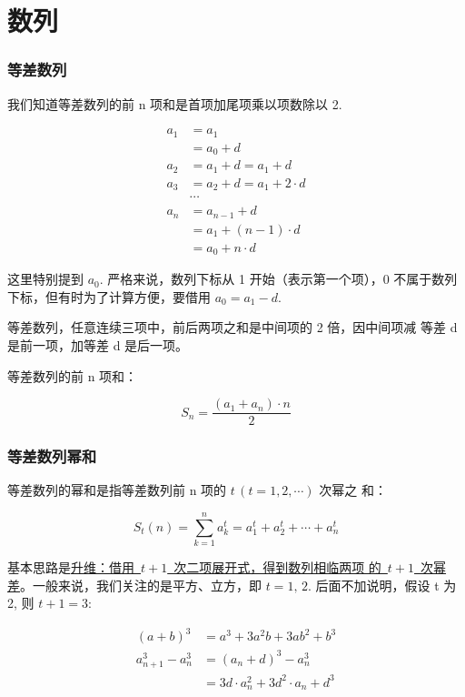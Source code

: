 \part{数列}

\section{等差数列}

我们知道等差数列的前 n 项和是首项加尾项乘以项数除以 2.

\[
  \begin{aligned}
    a_1 &= a_1 \\
    &= a_0 + d \\
    a_2 &= a_1 + d = a_1 + d \\
    a_3 &= a_2 + d = a_1 + 2 \cdot d \\
    & \cdots \\
    a_n &= a_{n-1} + d \\
    &= a_1 + (n - 1) \cdot d \\
    &= a_0 + n \cdot d
  \end{aligned}
\]

这里特别提到 $a_0$. 严格来说，数列下标从 1 开始（表示第一个项），0
不属于数列下标，但有时为了计算方便，要借用 $a_0 = a_1 - d$.

等差数列，任意连续三项中，前后两项之和是中间项的 2 倍，因中间项减
等差 d 是前一项，加等差 d 是后一项。

等差数列的前 n 项和：

\[
  S_n = \frac{(a_1 + a_n) \cdot n}{2}
\]

\section{等差数列幂和}

等差数列的幂和是指等差数列前 n 项的 $t\, (t = 1,2,\cdots)$ 次幂之
和：

\[
  S_t(n) = \sum_{k = 1}^n a_k^t = a_1^t + a_2^t + \cdots + a_n^t
\]

基本思路是\uline{升维：借用~$ t + 1$~次二项展开式，得到数列相临两项
  的~$t + 1$~次幂差}。一般来说，我们关注的是平方、立方，即 $t =
1,\, 2$. 后面不加说明，假设 t 为 2, 则 $t + 1 = 3$:

\[
  \begin{aligned}
    (a + b)^3 &= a^3 + 3a^2b + 3ab^2 + b^3 \\
    a_{n+1}^3 - a_n^3 &= (a_n + d)^3 - a_n^3 \\
    &= 3d \cdot a_n^2 + 3d^2 \cdot a_n + d^3
  \end{aligned}
\]


